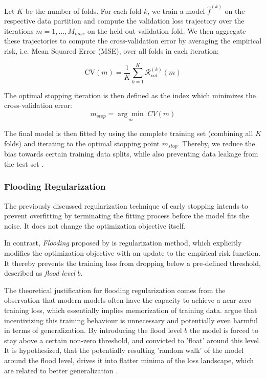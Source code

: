 \documentclass[fontsize=12 pt]{scrartcl}
\begin{document}
Let $K$ be the number of folds. For each fold $k$, we train a model $\hat{f}^{(k)}$ on the respective data partition and compute the validation loss trajectory over the iterations $m = 1, \dots, M_{max}$ on the held-out validation fold. We then aggregate these trajectories to compute the cross-validation error by averaging the empirical risk, i.e. Mean Squared Error (MSE), over all folds in each iteration:

\begin{equation}
    \text{CV}(m) = \frac{1}{K} \sum_{k=1}^K \mathcal{R}_{val}^{(k)}(m)
\end{equation}

The optimal stopping iteration is then defined as the index which minimizes the cross-validation error:
\begin{equation}
    m_{stop} = \underset{m}{\arg \min} \; CV(m)
\end{equation}

The final model is then fitted by using the complete training set (combining all $K$ folds) and iterating to the optimal stopping point $m_{stop}$. Thereby, we reduce the bias towards certain training data splits, while also preventing data leakage from the test set \citep{bischl2012resampling}. 

\subsubsection{Flooding Regularization}
\label{sec:flooding}

The previously discussed regularization technique of early stopping intends to prevent overfitting by terminating the fitting process before the model fits the noise. It does not change the optimization objective itself. 

In contrast, \textit{Flooding} proposed by \citet{ishida2020need} is regularization method, which explicitly modifies the optimization objective with an update to the empirical risk function. It thereby prevents the training loss from dropping below a pre-defined threshold, described as \textit{flood level} $b$.

The theoretical justification for flooding regularization comes from the observation that modern models often have the capacity to achieve a near-zero training loss, which essentially implies memorization of training data. \citet{ishida2020need} argue that incentivizing this training behaviour is unnecessary and potentially even harmful in terms of generalization. By introducing the flood level $b$ the model is forced to stay above a certain non-zero threshold, and convicted to 'float' around this level. It is hypothesized, that the potentially resulting 'random walk' of the model around the flood level, drives it into flatter minima of the loss landscape, which are related to better generalization \citep{hochreiter1997flat}. 
\end{document}
